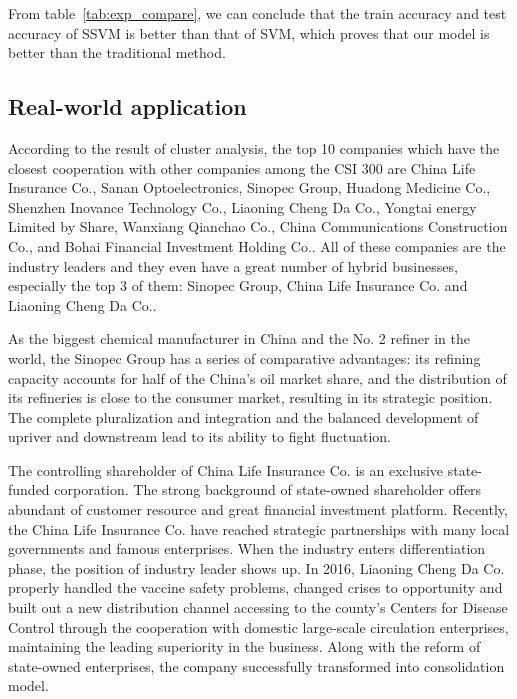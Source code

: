 From table~\ref{tab:exp_compare}, we can conclude that the train
accuracy and test accuracy of SSVM is better than that of SVM,
which proves that our model is better than the traditional
method.

\subsection{Real-world application}
\label{sec:exp_strategy}

According to the result of cluster analysis, the top 10 companies
which have the closest cooperation with other companies among the
CSI 300 are China Life Insurance Co., Sanan Optoelectronics,
Sinopec Group, Huadong Medicine Co., Shenzhen Inovance Technology
Co., Liaoning Cheng Da Co., Yongtai energy Limited by Share,
Wanxiang Qianchao Co., China Communications Construction Co., and
Bohai Financial Investment Holding Co.. All of these companies
are the industry leaders and they even have a great number of
hybrid businesses, especially the top 3 of them: Sinopec Group,
China Life Insurance Co. and Liaoning Cheng Da Co..

As the biggest chemical manufacturer in China and the No. 2
refiner in the world, the Sinopec Group has a series of
comparative advantages: its refining capacity accounts for half
of the China’s oil market share, and the distribution of its
refineries is close to the consumer market, resulting in its
strategic position. The complete pluralization and integration
and the balanced development of upriver and downstream lead to
its ability to fight fluctuation.

The controlling shareholder of China Life Insurance Co. is an
exclusive state-funded corporation. The strong background of
state-owned shareholder offers abundant of customer resource and
great financial investment platform. Recently, the China Life
Insurance Co. have reached strategic partnerships with many local
governments and famous enterprises. When the industry enters
differentiation phase, the position of industry leader shows up.
In 2016, Liaoning Cheng Da Co. properly handled the vaccine
safety problems, changed crises to opportunity and built out a
new distribution channel accessing to the county’s Centers for
Disease Control through the cooperation with domestic large-scale
circulation enterprises, maintaining the leading superiority in
the business. Along with the reform of state-owned enterprises,
the company successfully transformed into consolidation model.




